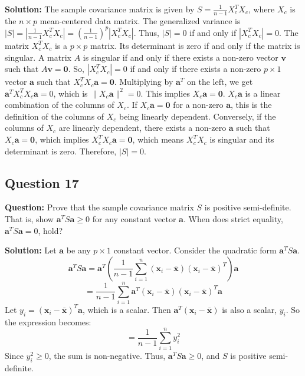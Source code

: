 \textbf{Solution:}
The sample covariance matrix is given by $S = \frac{1}{n-1} X_c^T X_c$, where $X_c$ is the $n \times p$ mean-centered data matrix.
The generalized variance is $|S| = |\frac{1}{n-1} X_c^T X_c| = (\frac{1}{n-1})^p |X_c^T X_c|$.
Thus, $|S| = 0$ if and only if $|X_c^T X_c| = 0$.
The matrix $X_c^T X_c$ is a $p \times p$ matrix. Its determinant is zero if and only if the matrix is singular.
A matrix $A$ is singular if and only if there exists a non-zero vector $\mathbf{v}$ such that $A\mathbf{v} = \mathbf{0}$.
So, $|X_c^T X_c| = 0$ if and only if there exists a non-zero $p \times 1$ vector $\mathbf{a}$ such that $X_c^T X_c \mathbf{a} = \mathbf{0}$.
Multiplying by $\mathbf{a}^T$ on the left, we get $\mathbf{a}^T X_c^T X_c \mathbf{a} = 0$, which is $\|X_c \mathbf{a}\|^2 = 0$.
This implies $X_c \mathbf{a} = \mathbf{0}$.
$X_c \mathbf{a}$ is a linear combination of the columns of $X_c$. If $X_c \mathbf{a} = \mathbf{0}$ for a non-zero $\mathbf{a}$, this is the definition of the columns of $X_c$ being linearly dependent.
Conversely, if the columns of $X_c$ are linearly dependent, there exists a non-zero $\mathbf{a}$ such that $X_c \mathbf{a} = \mathbf{0}$, which implies $X_c^T X_c \mathbf{a} = \mathbf{0}$, which means $X_c^T X_c$ is singular and its determinant is zero. Therefore, $|S|=0$.

\subsection*{Question 17}
\textbf{Question:} Prove that the sample covariance matrix $S$ is positive semi-definite. That is, show $\mathbf{a}^T S \mathbf{a} \ge 0$ for any constant vector $\mathbf{a}$. When does strict equality, $\mathbf{a}^T S \mathbf{a} = 0$, hold?

\textbf{Solution:}
Let $\mathbf{a}$ be any $p \times 1$ constant vector. Consider the quadratic form $\mathbf{a}^T S \mathbf{a}$.
$$ \mathbf{a}^T S \mathbf{a} = \mathbf{a}^T \left( \frac{1}{n-1} \sum_{i=1}^n (\mathbf{x}_i - \bar{\mathbf{x}})(\mathbf{x}_i - \bar{\mathbf{x}})^T \right) \mathbf{a} $$
$$ = \frac{1}{n-1} \sum_{i=1}^n \mathbf{a}^T (\mathbf{x}_i - \bar{\mathbf{x}})(\mathbf{x}_i - \bar{\mathbf{x}})^T \mathbf{a} $$
Let $y_i = (\mathbf{x}_i - \bar{\mathbf{x}})^T \mathbf{a}$, which is a scalar. Then $\mathbf{a}^T (\mathbf{x}_i - \bar{\mathbf{x}})$ is also a scalar, $y_i$. So the expression becomes:
$$ = \frac{1}{n-1} \sum_{i=1}^n y_i^2 $$
Since $y_i^2 \ge 0$, the sum is non-negative. Thus, $\mathbf{a}^T S \mathbf{a} \ge 0$, and $S$ is positive semi-definite.

